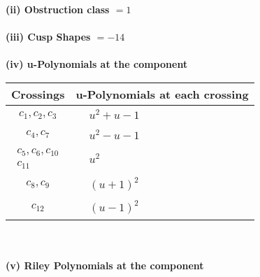 \documentclass[1p]{elsarticle_modified}
\theoremstyle{definition}
\begin{document}
\flushleft \textbf{(ii) Obstruction class $= 1$}\\~\\
\flushleft \textbf{(iii) Cusp Shapes $= -14$}\\~\\
\newpage\renewcommand{\arraystretch}{1}
\flushleft \textbf{(iv) u-Polynomials at the component}\newline \\
\begin{tabular}{m{50pt}|m{274pt}}
Crossings & \hspace{64pt}u-Polynomials at each crossing \\
\hline $$\begin{aligned}c_{1},c_{2},c_{3}\end{aligned}$$&$\begin{aligned}
&u^2+u-1
\end{aligned}$\\
\hline $$\begin{aligned}c_{4},c_{7}\end{aligned}$$&$\begin{aligned}
&u^2- u-1
\end{aligned}$\\
\hline $$\begin{aligned}c_{5},c_{6},c_{10}\\c_{11}\end{aligned}$$&$\begin{aligned}
&u^2
\end{aligned}$\\
\hline $$\begin{aligned}c_{8},c_{9}\end{aligned}$$&$\begin{aligned}
&(u+1)^2
\end{aligned}$\\
\hline $$\begin{aligned}c_{12}\end{aligned}$$&$\begin{aligned}
&(u-1)^2
\end{aligned}$\\
\hline
\end{tabular}\\~\\
\newpage\renewcommand{\arraystretch}{1}
\flushleft \textbf{(v) Riley Polynomials at the component}\newline \\
\end{document}
